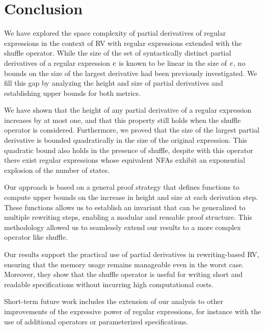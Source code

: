 \section{Conclusion}\label{sec:conclu}
We have explored the space complexity of partial derivatives of regular expressions in the context of RV with regular expressions extended with the shuffle operator. While the size of the set of syntactically distinct partial derivatives of a regular expression $\mathit {e}$ is known to be linear in the size
of $\mathit {e}$, no bounds on the size of the largest derivative had been previously investigated. We fill this gap by analyzing the height and size of partial derivatives and establishing upper bounds for both metrics.

We have shown that the height of any partial derivative of a regular expression increases by at most one, and that this property still holds when the shuffle operator is considered. Furthermore, we proved that the size of the largest partial derivative is bounded quadratically in the size of the original expression. This quadratic bound also holds in the presence of shuffle, despite with this operator there exist regular expressions whose equivalent NFAs exhibit an exponential explosion of the number of states.

Our approach is based on a general proof strategy that defines functions to compute upper bounds on the increase in height and size at each derivation step. These functions allows us to establish an invariant that can be generalized to multiple rewriting steps, enabling a modular and reusable proof structure. This methodology allowed us to seamlessly extend our results to a more complex operator like shuffle.

Our results support the practical use of partial derivatives in rewriting-based RV, ensuring that the memory usage remains manageable even in the worst case. Moreover, they show that the shuffle operator is useful for writing short and readable specifications without incurring high computational costs.

Short-term future work includes the extension of our analysis to
other improvements of the expressive power of regular expressions, for instance with the use of additional operators or parameterized specifications.
